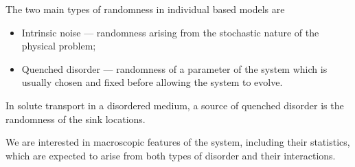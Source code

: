 
The two main types of randomness in individual based models are
\begin{itemize}
    \item Intrinsic noise --- randomness arising from the stochastic nature of the
        physical problem;
    \item Quenched disorder --- randomness of a parameter of the system which is
        usually chosen and fixed before allowing the system to evolve.
\end{itemize}
In solute transport in a disordered medium, a source of quenched disorder is the
randomness of the sink locations.

We are interested in macroscopic features of the system, including their
statistics, which are expected to arise from both types of disorder and their
interactions.

